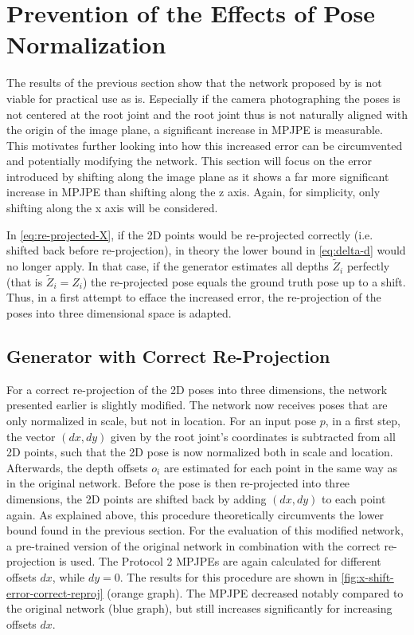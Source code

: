 \section{Prevention of the Effects of Pose Normalization}
\label{sec:network-adjusting}

The results of the previous section show that the network proposed by \citet{drover18} is not viable for practical use as is.
Especially if the camera photographing the poses is not centered at the root joint and the root joint thus is not naturally aligned with the origin of the image plane, a significant increase in MPJPE is measurable.
This motivates further looking into how this increased error can be circumvented and potentially modifying the network.
This section will focus on the error introduced by shifting along the image plane as it shows a far more significant increase in MPJPE than shifting along the z axis.
Again, for simplicity, only shifting along the x axis will be considered.

In \autoref{eq:re-projected-X}, if the 2D points would be re-projected correctly (i.e. shifted back before re-projection), in theory the lower bound in \autoref{eq:delta-d} would no longer apply.
In that case, if the generator estimates all depths $\widetilde{Z}_i$ perfectly (that is $\widetilde{Z}_i = Z_i$) the re-projected pose equals the ground truth pose up to a shift.
Thus, in a first attempt to efface the increased error, the re-projection of the poses into three dimensional space is adapted.

\subsection{Generator with Correct Re-Projection}

For a correct re-projection of the 2D poses into three dimensions, the network presented earlier is slightly modified.
The network now receives poses that are only normalized in scale, but not in location.
For an input pose $p$, in a first step, the vector $(dx, dy)$ given by the root joint's coordinates is subtracted from all 2D points, such that the 2D pose is now normalized both in scale and location.
Afterwards, the depth offsets $o_i$ are estimated for each point in the same way as in the original network.
Before the pose is then re-projected into three dimensions, the 2D points are shifted back by adding $(dx, dy)$ to each point again.
As explained above, this procedure theoretically circumvents the lower bound found in the previous section.
For the evaluation of this modified network, a pre-trained version of the original network in combination with the correct re-projection is used.
The Protocol 2 MPJPEs are again calculated for different offsets $dx$, while $dy = 0$.
The results for this procedure are shown in \autoref{fig:x-shift-error-correct-reproj} (orange graph).
The MPJPE decreased notably compared to the original network (blue graph), but still increases significantly for increasing offsets $dx$.

